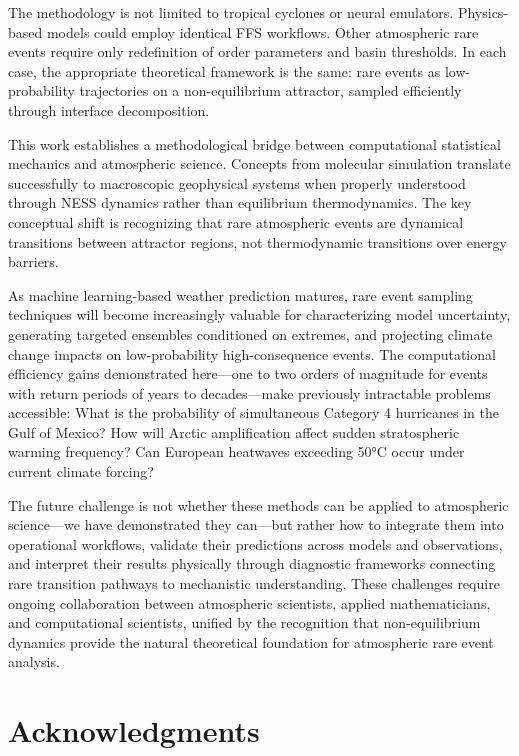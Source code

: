 \documentclass[11pt]{article}
\begin{document}
The methodology is not limited to tropical cyclones or neural emulators. Physics-based models could employ identical FFS workflows. Other atmospheric rare events require only redefinition of order parameters and basin thresholds. In each case, the appropriate theoretical framework is the same: rare events as low-probability trajectories on a non-equilibrium attractor, sampled efficiently through interface decomposition.

This work establishes a methodological bridge between computational statistical mechanics and atmospheric science. Concepts from molecular simulation translate successfully to macroscopic geophysical systems when properly understood through NESS dynamics rather than equilibrium thermodynamics. The key conceptual shift is recognizing that rare atmospheric events are dynamical transitions between attractor regions, not thermodynamic transitions over energy barriers.

As machine learning-based weather prediction matures, rare event sampling techniques will become increasingly valuable for characterizing model uncertainty, generating targeted ensembles conditioned on extremes, and projecting climate change impacts on low-probability high-consequence events. The computational efficiency gains demonstrated here—one to two orders of magnitude for events with return periods of years to decades—make previously intractable problems accessible: What is the probability of simultaneous Category 4 hurricanes in the Gulf of Mexico? How will Arctic amplification affect sudden stratospheric warming frequency? Can European heatwaves exceeding 50°C occur under current climate forcing?

The future challenge is not whether these methods can be applied to atmospheric science—we have demonstrated they can—but rather how to integrate them into operational workflows, validate their predictions across models and observations, and interpret their results physically through diagnostic frameworks connecting rare transition pathways to mechanistic understanding. These challenges require ongoing collaboration between atmospheric scientists, applied mathematicians, and computational scientists, unified by the recognition that non-equilibrium dynamics provide the natural theoretical foundation for atmospheric rare event analysis.


\section*{Acknowledgments}
\end{document}
